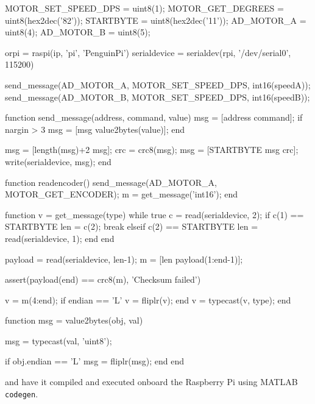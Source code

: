 \documentclass[11pt,fleqn]{article}
\begin{document}
\begin{Code}

        MOTOR_SET_SPEED_DPS = uint8(1);
        MOTOR_GET_DEGREES = uint8(hex2dec('82'));
        STARTBYTE = uint8(hex2dec('11'));
        AD_MOTOR_A 		= uint8(4);
        AD_MOTOR_B 		= uint8(5);
        
        orpi = raspi(ip, 'pi', 'PenguinPi')
        serialdevice = serialdev(rpi, '/dev/serial0', 115200)
            
        send_message(AD_MOTOR_A, MOTOR_SET_SPEED_DPS, int16(speedA));
        send_message(AD_MOTOR_B, MOTOR_SET_SPEED_DPS, int16(speedB));

        function send_message(address, command, value)
            msg = [address command];
            if nargin > 3
                msg = [msg value2bytes(value)];
            end
            
            msg = [length(msg)+2 msg];
            crc = crc8(msg);
            msg = [STARTBYTE msg crc];
            write(serialdevice, msg);
        end
        
        function readencoder()
            send_message(AD_MOTOR_A, MOTOR_GET_ENCODER);
            m = get_message('int16');
        end
        
        function v = get_message(type)
            while true
                c = read(serialdevice, 2);
                if c(1) == STARTBYTE
                    len = c(2);
                    break
                elseif c(2) == STARTBYTE
                    len = read(serialdevice, 1);
                end
            end

            payload = read(serialdevice, len-1);
            m = [len payload(1:end-1)];
            
            assert(payload(end) == crc8(m), 'Checksum failed')
            
            v = m(4:end);
            if endian == 'L'
                v = fliplr(v);
            end
            v = typecast(v, type);
        end
        
        function msg = value2bytes(obj, val)
            
            msg = typecast(val, 'uint8');
            
            if obj.endian == 'L'
                msg = fliplr(msg);
            end
        end
 \end{Code}
and have it compiled and executed onboard the Raspberry Pi using MATLAB \texttt{codegen}.
\end{document}
